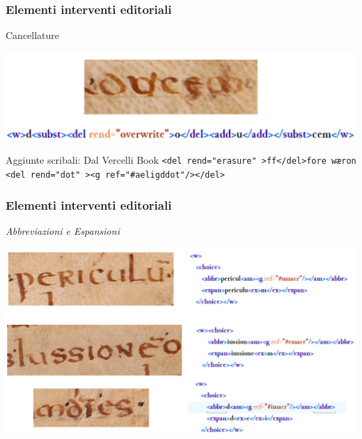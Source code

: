 \begin{frame}
    \frametitle{Elementi interventi editoriali}
    \addtocounter{nframe}{1}
    
    \begin{block}{Cancellature}
        \begin{center}
            \includegraphics[width=.9\textwidth]{imgs/Cancellature.png}
        \end{center}
    \end{block}
   
    \begin{block}{Aggiunte scribali: Dal Vercelli Book}
        \texttt{<del rend="erasure" >ff</del>fore wæron
        <del rend="dot" ><g ref="\#aeligddot"/></del>}
    \end{block}
    
\end{frame} 


\begin{frame}
    \frametitle{Elementi interventi editoriali}
    \addtocounter{nframe}{1}
    
   
    \textit{Abbreviazioni e Espansioni}
        \begin{center}
            \includegraphics[width=.95\textwidth]{imgs/Abbreviazioni-1.png}
        \end{center}

    
\end{frame}

